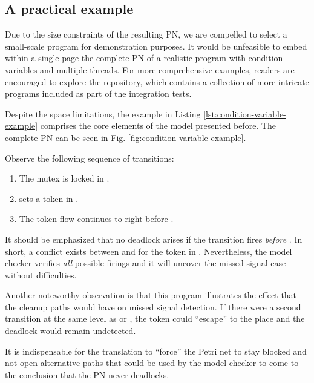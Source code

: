 \subsection{A practical example}

Due to the size constraints of the resulting \acrshort{PN},
we are compelled to select a small-scale program for demonstration purposes.
It would be unfeasible to embed within a single page
the complete \acrshort{PN} of a realistic program with condition variables and multiple threads.
For more comprehensive examples, readers are encouraged to explore the repository,
which contains a collection of more intricate programs included as part of the integration tests.

Despite the space limitations, the example in Listing \ref{lst:condition-variable-example}
comprises the core elements of the model presented before.
The complete \acrshort{PN} can be seen in Fig. \ref{fig:condition-variable-example}.

Observe the following sequence of transitions:

\begin{enumerate}
      \item The mutex is locked in .
      \item {} sets a token in .
      \item The token flow continues to  right before .
\end{enumerate}

It should be emphasized that no deadlock arises
if the transition  fires
\emph{before} .
In short, a conflict exists between 
and  for the token in .
Nevertheless, the model checker verifies \emph{all} possible firings
and it will uncover the missed signal case without difficulties.

Another noteworthy observation is that this program illustrates
the effect that the cleanup paths would have on missed signal detection.
If there were a second transition
at the same level as  or ,
the token could ``escape'' to the  place and the deadlock would remain undetected.

It is indispensable for the translation to ``force'' the Petri net to stay blocked
and not open alternative paths that could be used by the model checker
to come to the conclusion that the \acrshort{PN} never deadlocks.

